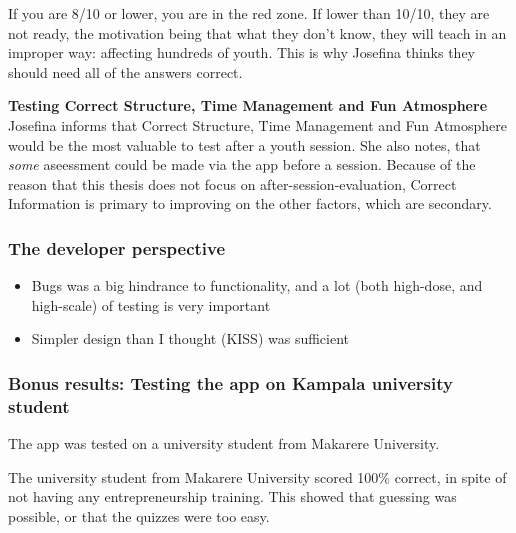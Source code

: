   If you are 8/10 or lower, you are in the red zone. If lower than 10/10, they are not ready, the motivation being that what they don't know, they will teach in an improper way: affecting hundreds of youth. This is why Josefina thinks they should need all of the answers correct.

  \textbf{Testing Correct Structure, Time Management and Fun Atmosphere}
  Josefina informs that Correct Structure, Time Management and Fun Atmosphere would be the most valuable to test after a youth session. She also notes, that \textit{some} aseessment could be made via the app before a session. Because of the reason that this thesis does not focus on after-session-evaluation, Correct Information is primary to improving on the other factors, which are secondary.

\subsubsection{The developer perspective}

  \begin{itemize}
    \item Bugs was a big hindrance to functionality, and a lot (both high-dose, and high-scale) of testing is very important
    \item Simpler design than I thought (KISS) was sufficient
  \end{itemize}

\subsubsection{Bonus results: Testing the app on Kampala university student}
The app was tested on a university student from Makarere University.

The university student from Makarere University scored 100\% correct, in spite of not having any entrepreneurship training. This showed that guessing was possible, or that the quizzes were too easy.
